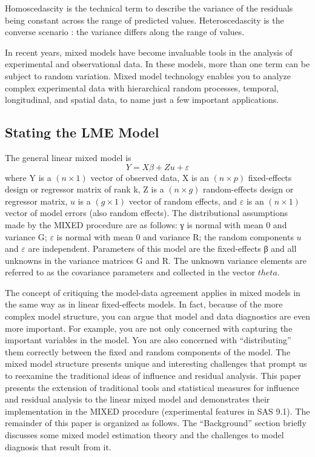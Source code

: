 \documentclass[12pt, a4paper]{article}
\begin{document}


Homoscedascity is the technical term to describe the variance of the
residuals being constant across the range of predicted values.
Heteroscedascity is the converse scenario : the variance differs along
the range of values.


% 
% 



In recent years, mixed models have become invaluable tools in the analysis of experimental and observational
data. In these models, more than one term can be subject to random variation. Mixed model
technology enables you to analyze complex experimental data with hierarchical random processes, temporal,
longitudinal, and spatial data, to name just a few important applications. 

\subsection{Stating the LME Model}
The general linear mixed
model is
\[
Y = X\beta + Zu + \varepsilon\]
where Y is a $(n\times1)$ vector of observed data, X is an $(n\times p)$ fixed-effects design or regressor matrix of rank
k, Z is a $(n \times g)$ random-effects design or regressor matrix, $u$ is a $(g \times 1)$ vector of random effects, and $\varepsilon$ is
an $(n\times1)$ vector of model errors (also random effects). The distributional assumptions made by the MIXED
procedure are as follows: γ is normal with mean 0 and variance G; $\varepsilon$ is normal with mean 0 and variance
R; the random components $u$ and $\varepsilon$ are independent. Parameters of this model are the fixed-effects β and
all unknowns in the variance matrices G and R. The unknown variance elements are referred to as the
covariance parameters and collected in the vector $theta$.

The concept of critiquing the model-data agreement applies in mixed models in the same way as in linear
fixed-effects models. In fact, because of the more complex model structure, you can argue that model and
data diagnostics are even more important. For example, you are not only concerned with capturing the
important variables in the model. You are also concerned with “distributing” them correctly between the
fixed and random components of the model. The mixed model structure presents unique and interesting
challenges that prompt us to reexamine the traditional ideas of influence and residual analysis.
This paper presents the extension of traditional tools and statistical measures for influence and residual
analysis to the linear mixed model and demonstrates their implementation in the MIXED procedure (experimental
features in SAS 9.1). The remainder of this paper is organized as follows. The “Background” section
briefly discusses some mixed model estimation theory and the challenges to model diagnosis that result
from it.
\end{document}
